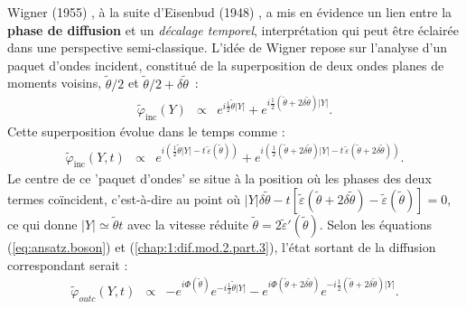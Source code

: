 Wigner (1955) \cite{Wigner_1955}, à la suite d’Eisenbud (1948) \cite{Eisenbud:1948paa}, a mis en évidence un lien entre la {\bf phase de diffusion} et un {\em décalage temporel}, interprétation qui peut être éclairée dans une perspective semi-classique. L’idée de Wigner repose sur l’analyse d’un paquet d’ondes incident, constitué de la superposition de deux ondes planes de moments voisins, $\tilde{\theta}/2$ et $\tilde{\theta}/2 + \delta \tilde{\theta}$ :
\begin{eqnarray}
	\tilde{\varphi}_{\text{inc}}(Y) & \propto & e^{i\frac{1}{2}\tilde{\theta} \vert Y\vert} + e^{i\frac{1}{2}\left(\tilde{\theta} + 2\delta \tilde{\theta} \right) \vert Y\vert}.
\end{eqnarray}
Cette superposition évolue dans le temps comme :
\begin{eqnarray}
\tilde{\varphi}_{\text{inc}}(Y, t) &\propto &  e^{i\left( \frac{1}{2} \tilde{\theta}\vert Y\vert - t\,\tilde{\varepsilon}(\tilde{\theta}) \right)} + e^{i\left( \frac{1}{2}\left(  \tilde{\theta} + 2\delta \tilde{\theta} \right) \vert Y\vert - t\,\tilde{\varepsilon}(\tilde{\theta} + 2\delta \tilde{\theta}) \right)}.
\end{eqnarray}
Le centre de ce 'paquet d'ondes' se situe à la position où les phases des deux termes coïncident, c'est-à-dire au point où $\vert Y\vert\delta \tilde{\theta}  - t[\tilde{\varepsilon}(\tilde{\theta} + 2\delta \tilde{\theta} ) - \tilde{\varepsilon}(\tilde{\theta})] = 0$, ce qui donne $\vert Y\vert \simeq \tilde{\theta} t$ avec la vitesse réduite $\tilde{\theta} = 2 \tilde{\varepsilon}'(\tilde{\theta}) $. %
Selon les équations (\ref{eq:ansatz.boson}) et (\ref{chap:1:dif.mod.2.part.3}), l'état sortant de la diffusion correspondant serait :
\begin{eqnarray}
	\tilde{\varphi}_{outc} ( Y, t ) & \propto & -e^{i\Phi(\tilde{\theta})}e^{-i\frac{1}{2}\tilde{\theta} \vert Y\vert} - e^{i\Phi(\tilde{\theta} + 2 \delta \tilde{\theta} )}e^{-i\frac{1}{2}\left(\tilde{\theta} + 2\delta \tilde{\theta} \right) \vert Y\vert}. %
\end{eqnarray}
